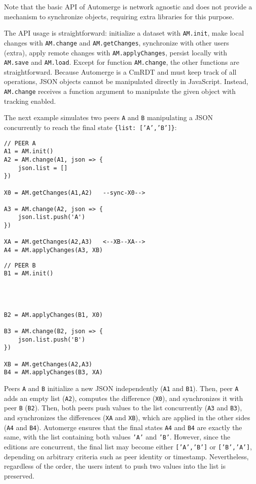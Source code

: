 \documentclass[12pt]{article}
\newcommand{\code}[1]  {\texttt{\footnotesize{#1}}}
\begin{document}
Note that the basic API of Automerge is network agnostic and does not provide
a mechanism to synchronize objects, requiring extra libraries for this purpose.

The API usage is straightforward:
    initialize a dataset with \code{AM.init},
    make local changes with \code{AM.change} and \code{AM.getChanges},
    synchronize with other users (extra),
    apply remote changes with \code{AM.applyChanges},
    persist locally with \code{AM.save} and \code{AM.load}.
Except for function \code{AM.change}, the other functions are straightforward.
%
Because Automerge is a CmRDT and must keep track of all operations, JSON
objects cannot be manipulated directly in JavaScript.
Instead, \code{AM.change} receives a function argument to manipulate
the given object with tracking enabled.

The next example simulates two peers \code{A} and \code{B} manipulating a
JSON concurrently to reach the final state \code{\{list: ['A','B']\}}:

\noindent
{\footnotesize
\begin{minipage}[t]{0.6\textwidth}
\begin{verbatim}
// PEER A
A1 = AM.init()
A2 = AM.change(A1, json => {
    json.list = []
})

X0 = AM.getChanges(A1,A2)   --sync-X0-->

A3 = AM.change(A2, json => {
    json.list.push('A')
})

XA = AM.getChanges(A2,A3)   <--XB--XA-->
A4 = AM.applyChanges(A3, XB)
\end{verbatim}
\end{minipage}
\begin{minipage}[t]{0.4\textwidth}
\begin{verbatim}
// PEER B
B1 = AM.init()




B2 = AM.applyChanges(B1, X0)

B3 = AM.change(B2, json => {
    json.list.push('B')
})

XB = AM.getChanges(A2,A3)
B4 = AM.applyChanges(B3, XA)
\end{verbatim}
\end{minipage}
}

Peers \code{A} and \code{B} initialize a new JSON independently (\code{A1} and
\code{B1}).
Then, peer \code{A} adds an empty list (\code{A2}), computes the difference
(\code{X0}), and synchronizes it with peer \code{B} (\code{B2}).
Then, both peers push values to the list concurrently (\code{A3} and
\code{B3}), and synchronizes the differences (\code{XA} and \code{XB}), which
are applied in the other sides (\code{A4} and \code{B4}).
Automerge ensures that the final states \code{A4} and \code{B4} are exactly the
same, with the list containing both values \code{'A'} and \code{'B'}.
However, since the editions are concurrent, the final list may become either
\code{['A','B']} or \code{['B','A']}, depending on arbitrary criteria such as
peer identity or timestamp.
Nevertheless, regardless of the order, the users intent to push two values into
the list is preserved.
\end{document}
